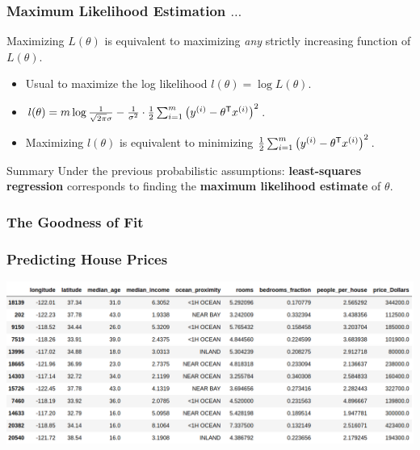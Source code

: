 \documentclass[xcolor=table]{beamer}
\newcommand{\trans}[1]{\ensuremath{#1}^{\scriptsize{\textsf{T}}}}
\begin{document}
\begin{frame}[t]
\frametitle{Maximum Likelihood Estimation $\ldots$}
Maximizing $L(\theta)$ is equivalent to maximizing \emph{any} strictly increasing 
function of $L(\theta)$.

\pause

\begin{itemize}
    \item Usual to maximize the log likelihood $l(\theta) = \log L(\theta)$.

    \item $l(\theta) = m \log \frac{1}{\sqrt{2 \pi} \sigma} - 
                        \frac{1}{\sigma^2} \cdot \frac{1}{2} 
                            \sum_{i = 1}^{m}{\left ( y^{(i)} - \trans{\theta} x^{(i)} \right ) ^2}$.
    \item Maximizing $l(\theta)$ is equivalent to minimizing 
        $\frac{1}{2} \sum_{i = 1}^{m}{\left ( y^{(i)} - \trans{\theta} x^{(i)} \right ) ^2}$.
\end{itemize} 

\pause

\bigskip

\begin{block}{Summary}
Under the previous probabilistic assumptions: \textbf{least-squares regression} 
corresponds to finding the \textbf{maximum likelihood estimate} of $\theta$.
\end{block}
\end{frame}

\begin{frame}[t]
\frametitle{The Goodness of Fit}
\end{frame}

\begin{frame}[t]
\frametitle{Predicting House Prices}
\begin{center}
    \includegraphics[scale=0.2]{housing_data.png}
\end{center}
\end{frame}
\end{document}

